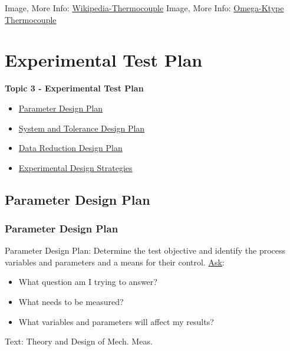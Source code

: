 \documentclass[fleqn]{beamer} %
\newcommand{\sectionIIItitle}{Experimental Test Plan}
\newcommand{\sectionIIIsubsectionItitle}{Parameter Design Plan}
\newcommand{\sectionIIIsubsectionIItitle}{System and Tolerance Design Plan}
\newcommand{\sectionIIIsubsectionIIItitle}{Data Reduction Design Plan}
\newcommand{\sectionIIIsubsectionIVtitle}{Experimental Design Strategies}
\begin{document}
\begin{frame}
\begin{multicols}{2}
				\end{multicols}	

				{\tiny Image, More Info: \href{https://en.wikipedia.org/wiki/Thermocouple}{Wikipedia-Thermocouple} }
				{\tiny Image, More Info: \href{https://www.omega.com/en-us/resources/k-type-thermocouples}{Omega-Ktype Thermocouple} }\hspace{40mm} 

			\end{frame}


	\section{\sectionIIItitle}\label{sectionIII}

		\begin{frame}
			\large \textbf{Topic 3 - \sectionIIItitle} \vspace{3mm}\\

			\begin{itemize}
				\item \hyperlink{sectionIIIsubsectionI}{\sectionIIIsubsectionItitle} \vspc %
				\item \hyperlink{sectionIIIsubsectionII}{\sectionIIIsubsectionIItitle} \vspc %
				\item \hyperlink{sectionIIIsubsectionIII}{\sectionIIIsubsectionIIItitle} \vspc %
				\item \hyperlink{sectionIIIsubsectionIV}{\sectionIIIsubsectionIVtitle} \vspc %
			\end{itemize}
		\end{frame}

		\subsection{\sectionIIIsubsectionItitle}\label{sectionIIIsubsectionI}

			\begin{frame}
				\frametitle{\sectionIIIsubsectionItitle}

				{\BL Parameter Design Plan}: Determine the test objective and identify the process variables and
				parameters and a means for their control. \vspc
				\underline{Ask}: \begin{itemize}
				\item What question am I trying to answer?
				\item What needs to be measured?
				\item What variables and parameters will affect my results?
				\end{itemize} 

				{\tiny Text: Theory and Design of Mech. Meas.}
			\end{frame}
\end{document}
